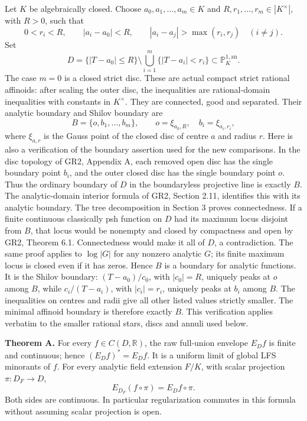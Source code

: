 \documentclass[11pt]{article}
\begin{document}
Let \(K\) be algebraically closed. Choose \(a_0,a_1,\ldots,a_m\in K\) and \(R,r_1,\ldots,r_m\in|K^\times|\), with \(R>0\), such that
\[
0<r_i<R,\qquad |a_i-a_0|<R,\qquad
|a_i-a_j|>\max(r_i,r_j)\quad(i\ne j).
\]
Set
\[
D=\{|T-a_0|\leq R\}\setminus\bigcup_{i=1}^m\{|T-a_i|<r_i\}
\subset\mathbb P^{1,\mathrm{an}}_K.
\]
The case \(m=0\) is a closed strict disc. These are actual compact strict rational affinoids: after scaling the outer disc, the inequalities are rational-domain inequalities with constants in \(K^\times\). They are connected, good and separated. Their analytic boundary and Shilov boundary are
\[
B=\{o,b_1,\ldots,b_m\},\qquad
o=\xi_{a_0,R},\quad b_i=\xi_{a_i,r_i},
\]
where \(\xi_{a,r}\) is the Gauss point of the closed disc of centre \(a\) and radius \(r\). Here is also a verification of the boundary assertion used for the new comparisons. In the disc topology of GR2, Appendix A, each removed open disc has the single boundary point \(b_i\), and the outer closed disc has the single boundary point \(o\). Thus the ordinary boundary of \(D\) in the boundaryless projective line is exactly \(B\). The analytic-domain interior formula of GR2, Section 2.11, identifies this with its analytic boundary. The tree decomposition in Section 3 proves connectedness. If a finite continuous classically psh function on \(D\) had its maximum locus disjoint from \(B\), that locus would be nonempty and closed by compactness and open by GR2, Theorem 6.1. Connectedness would make it all of \(D\), a contradiction. The same proof applies to \(\log|G|\) for any nonzero analytic \(G\); its finite maximum locus is closed even if it has zeros. Hence \(B\) is a boundary for analytic functions. It is the Shilov boundary: \((T-a_0)/c_0\), with \(|c_0|=R\), uniquely peaks at \(o\) among \(B\), while \(c_i/(T-a_i)\), with \(|c_i|=r_i\), uniquely peaks at \(b_i\) among \(B\). The inequalities on centres and radii give all other listed values strictly smaller. The minimal affinoid boundary is therefore exactly \(B\). This verification applies verbatim to the smaller rational stars, discs and annuli used below.

\textbf{Theorem A.} For every \(f\in C(D,\mathbb R)\), the raw full-union envelope \(E_Df\) is finite and continuous; hence \((E_Df)^*=E_Df\). It is a uniform limit of global LFS minorants of \(f\). For every analytic field extension \(F/K\), with scalar projection \(\pi:D_F\to D\),
\[
E_{D_F}(f\circ\pi)=E_Df\circ\pi.
\]
Both sides are continuous. In particular regularization commutes in this formula without assuming scalar projection is open.
\end{document}
